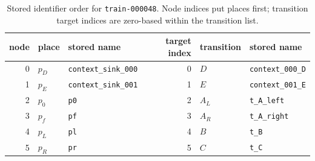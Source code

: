 \documentclass[11pt]{article}
\begin{document}
\begin{table}[htbp]
\centering
\small
\caption{Stored identifier order for \texttt{train-000048}. Node indices put
places first; transition target indices are zero-based within the transition list.}
\label{tab:stored-order}
\setlength{\tabcolsep}{3pt}
\begin{tabular}{@{}rll|rll@{}}
\toprule
node & place & stored name & target index & transition & stored name\\
\midrule
0 & $p_D$ & \texttt{context\_sink\_000} & 0 & $D$ & \texttt{context\_000\_D}\\
1 & $p_E$ & \texttt{context\_sink\_001} & 1 & $E$ & \texttt{context\_001\_E}\\
2 & $p_0$ & \texttt{p0} & 2 & $A_L$ & \texttt{t\_A\_left}\\
3 & $p_f$ & \texttt{pf} & 3 & $A_R$ & \texttt{t\_A\_right}\\
4 & $p_L$ & \texttt{pl} & 4 & $B$ & \texttt{t\_B}\\
5 & $p_R$ & \texttt{pr} & 5 & $C$ & \texttt{t\_C}\\
\bottomrule
\end{tabular}
\end{table}
\end{document}
